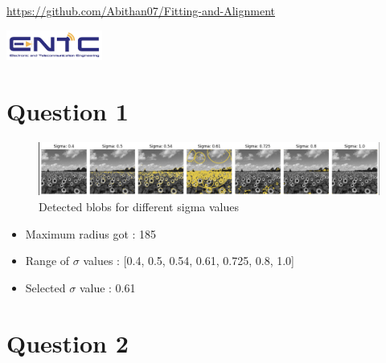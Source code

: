 \documentclass[12pt,a4paper]{article}
\makeatletter
\def\@submitdate{\number\the\day\space\space
  \ifcase\the\month\or
  January\or February\or March\or April\or May\or June\or
  July\or August\or September\or October\or November\or December\fi
  \space \number\the\year}
\makeatother
\begin{document}
\begin{titlepage}
     \centering
    \href{https://github.com/Abithan07/Fitting-and-Alignment}{\normalsize{https://github.com/Abithan07/Fitting-and-Alignment}}
    
    \vspace{8mm}
    \includegraphics[height=10mm]{ent.png}
\end{titlepage}


\section{Question 1}

    \begin{figure}[H]
        \centering
        \includegraphics[width=0.9\linewidth]{images/Screenshots/1.png}
        \caption{Detected blobs for different sigma values}
        \label{fig:enter-label}
    \end{figure}

    \begin{itemize}
        \item Maximum radius got : 185
        \item Range of $\sigma$ values : [0.4, 0.5, 0.54, 0.61, 0.725, 0.8, 1.0]
        \item Selected $\sigma$ value : 0.61
    \end{itemize}
    

\section{Question 2}
\end{document}
